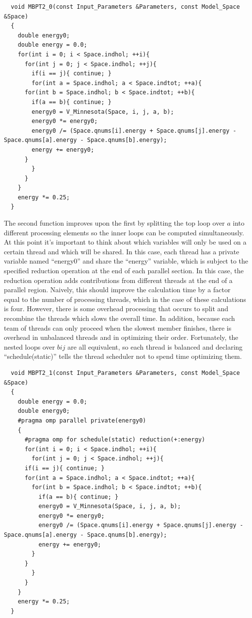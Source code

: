 \lstset{language=c++}
\begin{lstlisting}
  void MBPT2_0(const Input_Parameters &Parameters, const Model_Space &Space)
  {
    double energy0;
    double energy = 0.0;
    for(int i = 0; i < Space.indhol; ++i){
      for(int j = 0; j < Space.indhol; ++j){
        if(i == j){ continue; }
        for(int a = Space.indhol; a < Space.indtot; ++a){
	  for(int b = Space.indhol; b < Space.indtot; ++b){
	    if(a == b){ continue; }
	    energy0 = V_Minnesota(Space, i, j, a, b);
	    energy0 *= energy0;
	    energy0 /= (Space.qnums[i].energy + Space.qnums[j].energy - Space.qnums[a].energy - Space.qnums[b].energy);
	    energy += energy0;
	  }
        }
      }
    }
    energy *= 0.25;
  }
\end{lstlisting}

The second function improves upon the first by splitting the top loop over $a$ into different processing elements so the inner loops can be computed simultaneously. At this point it's important to think about which variables will only be used on a certain thread and which will be shared. In this case, each thread has a private variable named ``energy0'' and share the ``energy'' variable, which is subject to the specified reduction operation at the end of each parallel section. In this case, the reduction operation adds contributions from different threads at the end of a parallel region. Naively, this should improve the calculation time by a factor equal to the number of processing threads, which in the case of these calculations is four. However, there is some overhead processing that occurs to split and recombine the threads which slows the overall time. In addition, because each team of threads can only proceed when the slowest member finishes, there is overhead in unbalanced threads and in optimizing their order. Fortunately, the nested loops over $bij$ are all equivalent, so each thread is balanced and declaring ``schedule(static)'' tells the thread scheduler not to spend time optimizing them.

\begin{lstlisting}
  void MBPT2_1(const Input_Parameters &Parameters, const Model_Space &Space)
  {
    double energy = 0.0;
    double energy0;
    #pragma omp parallel private(energy0)
    {
      #pragma omp for schedule(static) reduction(+:energy)
      for(int i = 0; i < Space.indhol; ++i){
        for(int j = 0; j < Space.indhol; ++j){
	  if(i == j){ continue; }
	  for(int a = Space.indhol; a < Space.indtot; ++a){
	    for(int b = Space.indhol; b < Space.indtot; ++b){
	      if(a == b){ continue; }
	      energy0 = V_Minnesota(Space, i, j, a, b);
	      energy0 *= energy0;
	      energy0 /= (Space.qnums[i].energy + Space.qnums[j].energy - Space.qnums[a].energy - Space.qnums[b].energy);
	      energy += energy0;
	    }
	  }
        }
      }
    }
    energy *= 0.25;
  }
\end{lstlisting}

